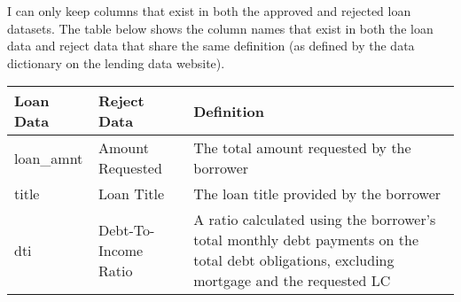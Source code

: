 \documentclass[11pt]{article}
\begin{document}
I can only keep columns that exist in both the approved and rejected
loan datasets. The table below shows the column names that exist in both
the loan data and reject data that share the same definition (as defined
by the data dictionary on the lending data website).

\begin{longtable}[]{@{}lll@{}}
\toprule
\begin{minipage}[b]{0.15\columnwidth}\raggedright\strut
Loan Data\strut
\end{minipage} & \begin{minipage}[b]{0.16\columnwidth}\raggedright\strut
Reject Data\strut
\end{minipage} & \begin{minipage}[b]{0.6\columnwidth}\raggedright\strut
Definition\strut
\end{minipage}\tabularnewline
\midrule
\endhead
\begin{minipage}[t]{0.15\columnwidth}\raggedright\strut
loan\_amnt\strut
\end{minipage} & \begin{minipage}[t]{0.16\columnwidth}\raggedright\strut
Amount Requested\strut
\end{minipage} & \begin{minipage}[t]{0.6\columnwidth}\raggedright\strut
The total amount requested by the borrower\strut
\end{minipage}\tabularnewline
\begin{minipage}[t]{0.15\columnwidth}\raggedright\strut
title\strut
\end{minipage} & \begin{minipage}[t]{0.16\columnwidth}\raggedright\strut
Loan Title\strut
\end{minipage} & \begin{minipage}[t]{0.6\columnwidth}\raggedright\strut
The loan title provided by the borrower\strut
\end{minipage}\tabularnewline
\begin{minipage}[t]{0.15\columnwidth}\raggedright\strut
dti\strut
\end{minipage} & \begin{minipage}[t]{0.16\columnwidth}\raggedright\strut
Debt-To-Income Ratio\strut
\end{minipage} & \begin{minipage}[t]{0.6\columnwidth}\raggedright\strut
A ratio calculated using the borrower's total monthly debt payments on
the total debt obligations, excluding mortgage and the requested LC

\end{minipage}
\end{longtable}
\end{document}
